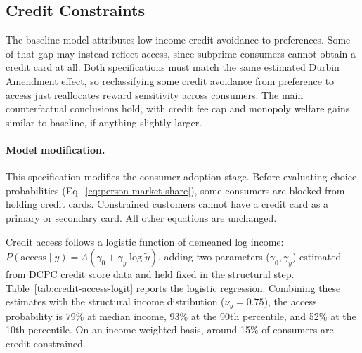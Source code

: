\documentclass[main.tex]{subfiles}
\begin{document}
\clearpage


\subsection{Credit Constraints}
\label{subsec:oa-credit-constrained}

The baseline model attributes low-income credit avoidance to preferences.
Some of that gap may instead reflect access, since subprime consumers cannot obtain a credit card at all.
Both specifications must match the same estimated Durbin Amendment effect, so reclassifying some credit avoidance from preference to access just reallocates reward sensitivity across consumers.
The main counterfactual conclusions hold, with credit fee cap and monopoly welfare gains similar to baseline, if anything slightly larger.

\paragraph{Model modification.} This specification modifies the consumer adoption stage.
Before evaluating choice probabilities (Eq.~\ref{eq:person-market-share}), some consumers are blocked from holding credit cards.
Constrained customers cannot have a credit card as a primary or secondary card.
All other equations are unchanged.

Credit access follows a logistic function of demeaned log income: $P(\text{access} \mid y) = \Lambda(\gamma_0 + \gamma_y \log \tilde{y})$, adding two parameters ($\gamma_0, \gamma_y$) estimated from DCPC credit score data and held fixed in the structural step.
Table~\ref{tab:credit-access-logit} reports the logistic regression.
Combining these estimates with the structural income distribution ($\nu_y = 0.75$), the access probability is 79\% at median income, 93\% at the 90th percentile, and 52\% at the 10th percentile.
On an income-weighted basis, around 15\% of consumers are credit-constrained.
\end{document}

